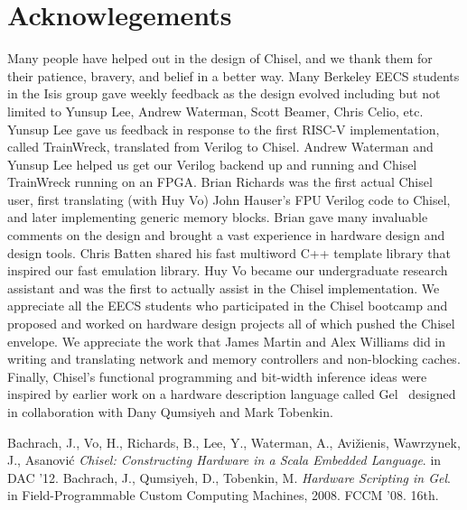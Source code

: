 \documentclass[twocolumn,10pt]{article}
\def\note#1{\noindent{\bf [Note: #1]}}
\begin{document}
\section{Acknowlegements}

Many people have helped out in the design of Chisel, and we thank them
for their patience, bravery, and belief in a better way.  Many
Berkeley EECS students in the Isis group gave weekly feedback as the
design evolved including but not limited to Yunsup Lee, Andrew
Waterman, Scott Beamer, Chris Celio, etc.  Yunsup Lee gave us feedback
in response to the first RISC-V implementation, called TrainWreck,
translated from Verilog to Chisel.  Andrew Waterman and Yunsup Lee
helped us get our Verilog backend up and running and Chisel TrainWreck
running on an FPGA.  Brian Richards was the first actual Chisel user,
first translating (with Huy Vo) John Hauser's FPU Verilog code to
Chisel, and later implementing generic memory blocks.  Brian gave many
invaluable comments on the design and brought a vast experience in
hardware design and design tools.  Chris Batten shared his fast
multiword C++ template library that inspired our fast emulation
library.  Huy Vo became our undergraduate research assistant and was
the first to actually assist in the Chisel implementation.  We
appreciate all the EECS students who participated in the Chisel
bootcamp and proposed and worked on hardware design projects all of
which pushed the Chisel envelope.  We appreciate the work that James
Martin and Alex Williams did in writing and translating network and
memory controllers and non-blocking caches.  Finally, Chisel's
functional programming and bit-width inference ideas were inspired by
earlier work on a hardware description language called Gel~\cite{gel} designed in
collaboration with Dany Qumsiyeh and Mark Tobenkin.


\begin{thebibliography}{50}
 Bachrach, J., Vo, H., Richards, B., Lee, Y., Waterman,
  A., Avi\v{z}ienis, Wawrzynek, J., Asanovi\'{c} \textsl{Chisel:
    Constructing Hardware in a Scala Embedded Language}.
in DAC '12.
 Bachrach, J., Qumsiyeh, D., Tobenkin, M. \textsl{Hardware Scripting in Gel}.
in Field-Programmable Custom Computing Machines, 2008. FCCM '08. 16th.
\end{thebibliography}
\end{document}
